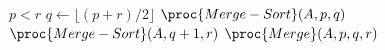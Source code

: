 \begin{codebox}
\li \If $p<r$
\li \Then $q \gets \lfloor(p+r)/2\rfloor$
\li   $\proc{Merge-Sort}(A,p,q)$
\li   $\proc{Merge-Sort}(A,q+1,r)$
\li   $\proc{Merge}(A,p,q,r)$
    \End
\end{codebox}
